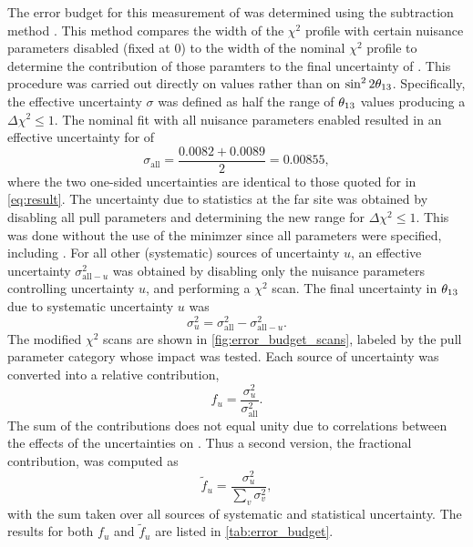 The error budget for this measurement of \thetaot{}
was determined using the subtraction method \cite{nh2016technote}.
This method compares the width of the $\chi^2$ profile
with certain nuisance parameters disabled (fixed at 0)
to the width of the nominal $\chi^2$ profile
to determine the contribution of those paramters
to the final uncertainty of \thetaot{}.
This procedure was carried out directly on \thetaot{} values
rather than on $\sin^22\theta_{13}$.
Specifically, the effective uncertainty $\sigma$
was defined as half the range of $\theta_{13}$ values
producing a $\Delta \chi^2 \leq 1$.
The nominal fit with all nuisance parameters enabled
resulted in an effective uncertainty for \thetaot{} of
\begin{equation}\label{eq:nominal_unc}
    \sigma_\text{all} = \frac{0.0082 + 0.0089}{2} = 0.00855,
\end{equation}
where the two one-sided uncertainties are identical
to those quoted for \thetaot{} in \cref{eq:result}.
The uncertainty due to statistics at the far site was obtained
by disabling all pull parameters
and determining the new range for $\Delta \chi^2 \leq 1$.
This was done without the use of the minimzer since all parameters were specified,
including \thetaot{}.
For all other (systematic) sources of uncertainty $u$,
an effective uncertainty $\sigma^2_{\text{all}-u}$
was obtained by disabling only the nuisance parameters
controlling uncertainty $u$,
and performing a $\chi^2$ scan.
The final uncertainty in $\theta_{13}$ due to
systematic uncertainty $u$ was
\begin{equation}\label{eq:syst_error_budget}
    \sigma^2_u = \sigma^2_\text{all} - \sigma^2_{\text{all}-u}.
\end{equation}
The modified $\chi^2$ scans are shown in \cref{fig:error_budget_scans},
labeled by the pull parameter category whose impact was tested.
Each source of uncertainty was converted into a relative contribution,
\begin{equation}\label{eq:syst_error_rel}
    f_u = \frac{\sigma^2_u}{\sigma^2_{\text{all}}}.
\end{equation}
The sum of the contributions does not equal unity
due to correlations between the effects of the uncertainties
on \thetaot{}.
Thus a second version, the fractional contribution, was computed as
\begin{equation}\label{eq:syst_error_frac}
    \tilde{f}_u = \frac{\sigma^2_u}{\sum_v \sigma^2_v},
\end{equation}
with the sum taken over all sources of systematic and statistical uncertainty.
The results for both $f_u$ and $\tilde{f}_u$ are
listed in \cref{tab:error_budget}.



